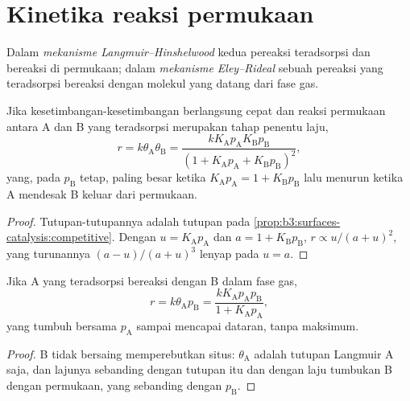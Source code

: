 \section{Kinetika reaksi permukaan}

\begin{definition}\label{def:b3:surfaces-catalysis:mechanisms}
Dalam \emph{mekanisme Langmuir--Hinshelwood}
kedua pereaksi teradsorpsi dan bereaksi di permukaan; dalam
\emph{mekanisme Eley--Rideal} sebuah pereaksi yang
teradsorpsi bereaksi dengan molekul yang datang dari fase gas.
\end{definition}

\begin{proposition}\label{prop:b3:surfaces-catalysis:lh-rate}
Jika kesetimbangan-kesetimbangan  berlangsung cepat dan reaksi
permukaan antara A dan B yang teradsorpsi merupakan tahap penentu laju,
\[
  r = k\theta_{\mathrm A}\theta_{\mathrm B} = \frac{kK_{\mathrm A}p_{\mathrm A}K_{\mathrm B}p_{\mathrm B}}{(1 + K_{\mathrm A}p_{\mathrm A} + K_{\mathrm B}p_{\mathrm B})^2},
\]
yang, pada $p_{\mathrm B}$ tetap, paling besar ketika $K_{\mathrm A}p_{\mathrm A} = 1 + K_{\mathrm B}p_{\mathrm B}$ lalu menurun ketika A mendesak B keluar dari
permukaan.
\end{proposition}

\begin{proof}
Tutupan-tutupannya adalah tutupan pada \cref{prop:b3:surfaces-catalysis:competitive}. Dengan $u =
K_{\mathrm A}p_{\mathrm A}$ dan $a = 1 + K_{\mathrm B}p_{\mathrm B}$, $r \propto u/(a + u)^2$, yang turunannya $(a - u)/(a + u)^3$ lenyap pada
$u = a$.
\end{proof}

\begin{proposition}\label{prop:b3:surfaces-catalysis:er-rate}
Jika A yang teradsorpsi bereaksi dengan B dalam fase gas,
\[
  r = k\theta_{\mathrm A}p_{\mathrm B} = \frac{kK_{\mathrm A}p_{\mathrm A}p_{\mathrm B}}{1 + K_{\mathrm A}p_{\mathrm A}},
\]
yang tumbuh bersama $p_{\mathrm A}$ sampai mencapai dataran, tanpa maksimum.
\end{proposition}

\begin{proof}
B tidak bersaing memperebutkan situs: $\theta_{\mathrm A}$ adalah tutupan Langmuir A saja, dan
lajunya sebanding dengan tutupan itu dan dengan laju tumbukan B dengan permukaan,
yang sebanding dengan $p_{\mathrm B}$.
\end{proof}

